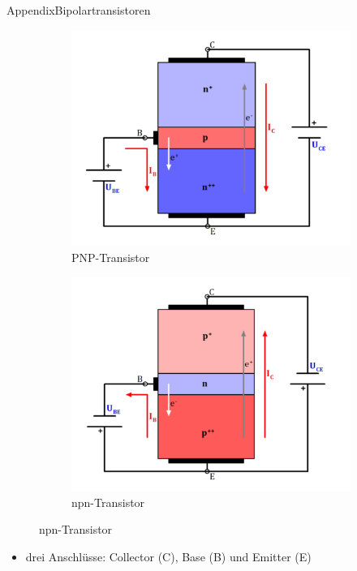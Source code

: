 \begin{frame}[allowframebreaks]{Appendix}{Bipolartransistoren}
	\begin{figure}
    \begin{subfigure}{0.4\textwidth}
      \centering
      \includegraphics[height=0.5\textheight]{figures/pnp-Transistor}
      \caption{PNP-Transistor}
      \label{fig:pnp-transistor}
    \end{subfigure}
    \begin{subfigure}{0.4\textwidth}
      \centering
      \includegraphics[height=0.5\textheight]{figures/npn-Transistor}
      \caption{npn-Transistor}
      \label{fig:npn-transistor}
    \end{subfigure}
	\end{figure}
  \begin{itemize}
    \item \alert{drei Anschlüsse:} Collector (C), Base (B) und Emitter (E)
  \end{itemize}
\end{frame}

